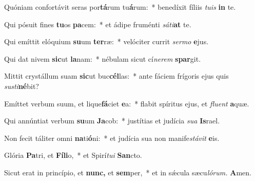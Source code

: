 \item Quóniam confortávit seras por\textbf{tá}rum tu\textbf{á}rum:~* benedíxit fíliis \textit{tuis} \textbf{in} te.
\item Qui pósuit fines \textbf{tu}os \textbf{pa}cem:~* et ádipe fruménti \textit{sáti}\textbf{at} te.
\item Qui emíttit elóquium \textbf{su}um \textbf{ter}ræ:~* velóciter currit \textit{sermo} \textbf{e}jus.
\item Qui dat nivem \textbf{sic}ut \textbf{la}nam:~* nébulam sicut cí\textit{nerem} \textbf{spar}git.
\item Mittit crystállum suam \textbf{sic}ut buc\textbf{cél}las:~* ante fáciem frígoris ejus quis \textit{susti}\textbf{né}bit?
\item Emíttet verbum suum, et lique\textbf{fá}ciet \textbf{e}a:~* flabit spíritus ejus, et \textit{fluent} \textbf{a}quæ.
\item Qui annúntiat verbum \textbf{su}um \textbf{Ja}cob:~* justítias et judícia \textit{sua} \textbf{Is}rael.
\item Non fecit táliter omni \textbf{na}ti\textbf{ó}ni:~* et judícia sua non manife\hspace*{0.03em}\textit{stávit} \textbf{e}is.
\item Glória \textbf{Pa}tri, et \textbf{Fíli}o,~* et Spirí\hspace*{0.03em}\textit{tui} \textbf{San}cto.
\item Sicut erat in princípio, et \textbf{nunc,} et \textbf{sem}per,~* et in sǽcula sæcu\hspace*{0.03em}\textit{lórum.} \textbf{A}men.
